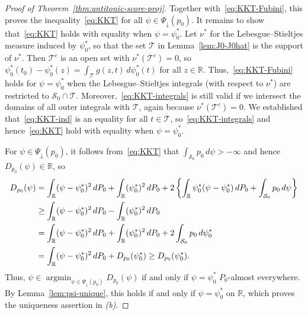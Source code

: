 \documentclass[a4paper]{article}
\newcommand{\R}{\mathbb{R}}
\DeclareMathOperator*{\argmin}{argmin}
\theoremstyle{definition}
\begin{document}
\begin{proof}[Proof of Theorem~\ref{thm:antitonic-score-proj}]
Together with~\eqref{eq:KKT-Fubini}, this proves the inequality~\eqref{eq:KKT} for all $\psi \in \Psi_\downarrow(p_0)$. It remains to show that~\eqref{eq:KKT} holds with equality when $\psi = \psi_0^*$. Let $\nu^*$ for the Lebesgue--Stieltjes measure induced by $\psi_0^*$, so that the set $\mathcal{T}$ in Lemma~\ref{lem:J0-J0hat} is the support of $\nu^*$. Then $\mathcal{T}^c$ is an open set with $\nu^*(\mathcal{T}^c) = 0$, so $\psi_0^*(t_0) - \psi_0^*(z) = \int_\mathcal{T} g(z,t)\,d\psi_0^*(t)$ for all $z \in \R$. Thus,~\eqref{eq:KKT-Fubini} holds for $\psi = \psi_0^*$ when the Lebesgue--Stieltjes integrals (with respect to $\nu^*$) are restricted to $\mathcal{S}_0\cap\mathcal{T}$. Moreover,~\eqref{eq:KKT-integrals} is still valid if we intersect the domains of all outer integrals with $\mathcal{T}$, again because $\nu^*(\mathcal{T}^c) = 0$. We established that~\eqref{eq:KKT-ind} is an equality for all $t \in \mathcal{T}$, so~\eqref{eq:KKT-integrals} and hence~\eqref{eq:KKT} hold with equality when $\psi = \psi_0^*$.

\medskip
\noindent
For $\psi \in \Psi_\downarrow(p_0)$, it follows from~\eqref{eq:KKT} that $\int_{\mathcal{S}_0} p_0\,d\psi > -\infty$ and hence $D_{p_0}(\psi) \in \R$, so
\begin{align}
D_{p_0}(\psi) &= \int_\R(\psi - \psi_0^*)^2\,dP_0 + \int_\R(\psi_0^*)^2\,dP_0 + 2\,\biggl\{\int_\R\psi_0^*(\psi - \psi_0^*)\,dP_0 + \int_{\mathcal{S}_0} p_0\,d\psi\biggr\} \notag \\
\label{eq:inf-Dp0}
&\geq \int_\R(\psi - \psi_0^*)^2\,dP_0 -\int_\R (\psi_0^*)^2\,dP_0 \\
&= \int_\R(\psi - \psi_0^*)^2\,dP_0 + \int_\R (\psi_0^*)^2\,dP_0 + 2\int_{\mathcal{S}_0} p_0\,d\psi_0^* \notag \\
&= \int_\R(\psi - \psi_0^*)^2\,dP_0 + D_{p_0}(\psi_0^*) \geq D_{p_0}(\psi_0^*) \notag.
\end{align}
Thus, $\psi \in \argmin_{\psi \in \Psi_\downarrow(p_0)}D_{p_0}(\psi)$ if and only if $\psi = \psi_0^*$ $P_0$-almost everywhere. By Lemma~\ref{lem:psi-unique}, this holds if and only if $\psi = \psi_0^*$ on $\R$, which proves the uniqueness assertion in \textit{(b)}.


\end{proof}
\end{document}
